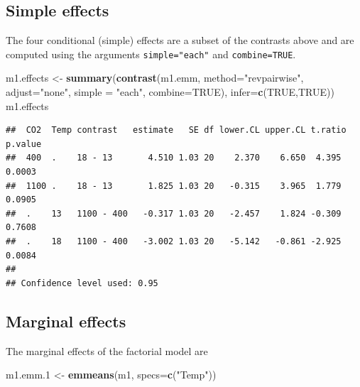 \documentclass[]{book}
\newenvironment{Shaded}{\begin{snugshade}}{\end{snugshade}}
\newcommand{\DataTypeTok}[1]{\textcolor[rgb]{0.13,0.29,0.53}{#1}}
\newcommand{\FloatTok}[1]{\textcolor[rgb]{0.00,0.00,0.81}{#1}}
\newcommand{\KeywordTok}[1]{\textcolor[rgb]{0.13,0.29,0.53}{\textbf{#1}}}
\newcommand{\NormalTok}[1]{#1}
\newcommand{\OtherTok}[1]{\textcolor[rgb]{0.56,0.35,0.01}{#1}}
\newcommand{\StringTok}[1]{\textcolor[rgb]{0.31,0.60,0.02}{#1}}
\begin{document}
\hypertarget{simple-effects}{%
\subsection{Simple effects}\label{simple-effects}}

The four conditional (simple) effects are a subset of the contrasts above and are computed using the arguments \texttt{simple="each"} and \texttt{combine=TRUE}.

\begin{Shaded}
\begin{Highlighting}[]
\NormalTok{m1.effects <-}\StringTok{ }\KeywordTok{summary}\NormalTok{(}\KeywordTok{contrast}\NormalTok{(m1.emm,}
                 \DataTypeTok{method=}\StringTok{"revpairwise"}\NormalTok{,}
                 \DataTypeTok{adjust=}\StringTok{"none"}\NormalTok{,}
                 \DataTypeTok{simple =} \StringTok{"each"}\NormalTok{,}
                 \DataTypeTok{combine=}\OtherTok{TRUE}\NormalTok{),}
        \DataTypeTok{infer=}\KeywordTok{c}\NormalTok{(}\OtherTok{TRUE}\NormalTok{,}\OtherTok{TRUE}\NormalTok{))}
\NormalTok{m1.effects}
\end{Highlighting}
\end{Shaded}

\begin{verbatim}
##  CO2  Temp contrast   estimate   SE df lower.CL upper.CL t.ratio p.value
##  400  .    18 - 13       4.510 1.03 20    2.370    6.650  4.395  0.0003 
##  1100 .    18 - 13       1.825 1.03 20   -0.315    3.965  1.779  0.0905 
##  .    13   1100 - 400   -0.317 1.03 20   -2.457    1.824 -0.309  0.7608 
##  .    18   1100 - 400   -3.002 1.03 20   -5.142   -0.861 -2.925  0.0084 
## 
## Confidence level used: 0.95
\end{verbatim}

\hypertarget{marginal-effects-1}{%
\subsection{Marginal effects}\label{marginal-effects-1}}

The marginal effects of the factorial model are

\begin{Shaded}
\begin{Highlighting}[]
\NormalTok{m1.emm}\FloatTok{.1}\NormalTok{ <-}\StringTok{ }\KeywordTok{emmeans}\NormalTok{(m1, }\DataTypeTok{specs=}\KeywordTok{c}\NormalTok{(}\StringTok{"Temp"}\NormalTok{))}
\end{Highlighting}
\end{Shaded}
\end{document}
